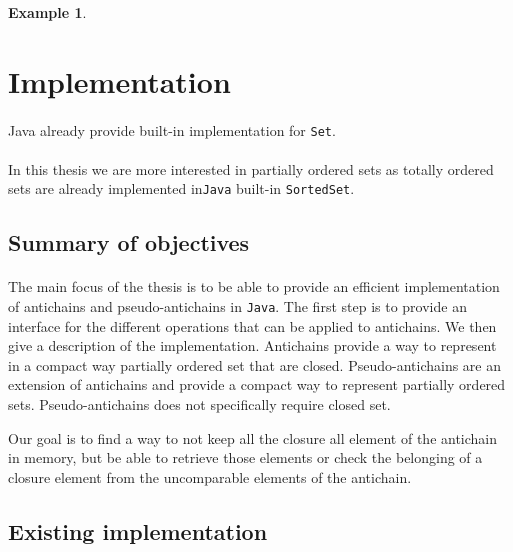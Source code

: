 \documentclass[letterpaper]{article}
\theoremstyle{definition}
\newtheorem{example}{Example}[subsection]
\begin{document}
\begin{example}
\section{Implementation}

\paragraph{}

Java already provide built-in implementation for \texttt{Set}.

\paragraph{}

In this thesis we are more interested in partially ordered sets as
totally ordered sets are already implemented
in\texttt{Java} built-in
\texttt{SortedSet}.

\subsection{Summary of objectives}


\paragraph{}


The main focus of the thesis is to be able to provide an efficient
implementation of antichains and pseudo-antichains in \texttt{Java}.
The first step is to provide an interface for the different operations that
can be applied to antichains. We then give a description of the implementation.
Antichains provide a way to represent
in a compact way partially ordered set that are closed. Pseudo-antichains
are an extension of antichains and provide a compact way to represent
partially ordered sets. Pseudo-antichains does not specifically require
closed set.

Our goal is to find a way to not keep all the closure all
element of the antichain in memory, but be able to retrieve those elements
or check the belonging of a closure element from the uncomparable elements
of the antichain.

\subsection{Existing implementation}


\end{example}
\end{document}

